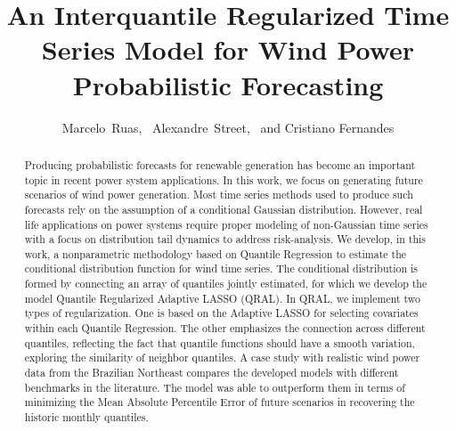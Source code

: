 \documentclass[journal]{IEEEtran}
\begin{document}
\title{An Interquantile Regularized Time Series Model for Wind Power Probabilistic Forecasting}

\author{Marcelo~Ruas,~%
	 	Alexandre~Street,~%
		and Cristiano Fernandes
	
}

\maketitle


\begin{abstract}

Producing probabilistic forecasts for renewable generation has become an important topic in recent power system applications. In this work, we focus on generating future scenarios of wind power generation.  Most time series methods used to produce such forecasts rely on the assumption of a conditional Gaussian distribution. However, real life applications on power systems require proper modeling of non-Gaussian time series with a focus on distribution tail dynamics to address risk-analysis.  
We develop, in this work, a nonparametric methodology based on Quantile Regression to estimate the conditional distribution function for wind time series.  
The conditional distribution is formed by connecting an array of quantiles jointly estimated, for which we develop the model Quantile Regularized Adaptive LASSO (QRAL).	In QRAL, we implement two types of regularization. One is based on the Adaptive LASSO for selecting covariates within each Quantile Regression. 
The other emphasizes the connection across different quantiles, reflecting the fact that quantile functions should have a smooth variation,
exploring the similarity of neighbor quantiles.	A case study with realistic wind power data from the Brazilian Northeast compares the developed models with different benchmarks in the literature. The model was able to outperform them in terms of minimizing the Mean Absolute Percentile Error of future scenarios in recovering the historic monthly quantiles.
\end{abstract}
\end{document}
